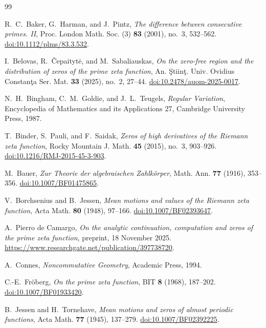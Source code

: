 \documentclass[11pt]{article}
\theoremstyle{definition}
\theoremstyle{remark}
\begin{document}
{}
\begin{thebibliography}{99}

R.~C.~Baker, G.~Harman, and J.~Pintz,
\emph{The difference between consecutive primes. II},
Proc. London Math. Soc. (3) \textbf{83} (2001), no.~3, 532--562.
\href{https://doi.org/10.1112/plms/83.3.532}{doi:10.1112/plms/83.3.532}.

I.~Belovas, R.~\v{C}epaityt\.{e}, and M.~Sabaliauskas,
\emph{On the zero-free region and the distribution of zeros of the prime zeta
function},
An. \c{S}tiin\c{t}. Univ. Ovidius Constan\c{t}a Ser. Mat. \textbf{33} (2025), no.~2,
27--44.
\href{https://doi.org/10.2478/auom-2025-0017}{doi:10.2478/auom-2025-0017}.

N.~H.~Bingham, C.~M.~Goldie, and J.~L.~Teugels,
\emph{Regular Variation},
Encyclopedia of Mathematics and its Applications 27, Cambridge University Press,
1987.

T.~Binder, S.~Pauli, and F.~Saidak,
\emph{Zeros of high derivatives of the Riemann zeta function},
Rocky Mountain J. Math. \textbf{45} (2015), no.~3, 903--926.
\href{https://doi.org/10.1216/RMJ-2015-45-3-903}
{doi:10.1216/RMJ-2015-45-3-903}.

M.~Bauer,
\emph{Zur Theorie der algebraischen Zahlk\"orper},
Math. Ann. \textbf{77} (1916), 353--356.
\href{https://doi.org/10.1007/BF01475865}{doi:10.1007/BF01475865}.

V.~Borchsenius and B.~Jessen,
\emph{Mean motions and values of the Riemann zeta function},
Acta Math. \textbf{80} (1948), 97--166.
\href{https://doi.org/10.1007/BF02393647}{doi:10.1007/BF02393647}.

A.~Pierro de Camargo,
\emph{On the analytic continuation, computation and zeros of the prime zeta function},
preprint, 18 November 2025.
\url{https://www.researchgate.net/publication/397738720}.

A.~Connes,
\emph{Noncommutative Geometry},
Academic Press, 1994.

C.-E.~Fr\"oberg,
\emph{On the prime zeta function},
BIT \textbf{8} (1968), 187--202.
\href{https://doi.org/10.1007/BF01933420}{doi:10.1007/BF01933420}.

B.~Jessen and H.~Tornehave,
\emph{Mean motions and zeros of almost periodic functions},
Acta Math. \textbf{77} (1945), 137--279.
\href{https://doi.org/10.1007/BF02392225}{doi:10.1007/BF02392225}.


\end{thebibliography}
\end{document}
